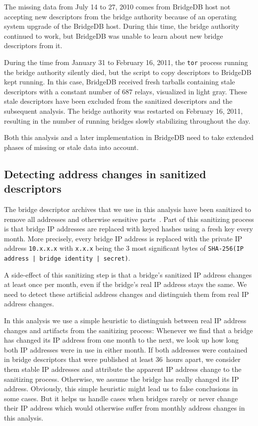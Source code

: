 \documentclass{article}
\begin{document}
The missing data from July 14 to 27, 2010 comes from BridgeDB host not
accepting new descriptors from the bridge authority because of an
operating system upgrade of the BridgeDB host.
During this time, the bridge authority continued to work, but BridgeDB was
unable to learn about new bridge descriptors from it.

During the time from January 31 to February 16, 2011, the \verb+tor+
process running the bridge authority silently died, but the script to copy
descriptors to BridgeDB kept running.
In this case, BridgeDB received fresh tarballs containing stale
descriptors with a constant number of 687 relays, visualized in light
gray.
These stale descriptors have been excluded from the sanitized descriptors
and the subsequent analysis.
The bridge authority was restarted on February 16, 2011, resulting in the
number of running bridges slowly stabilizing throughout the day.

Both this analysis and a later implementation in BridgeDB need to take
extended phases of missing or stale data into account.

\subsection{Detecting address changes in sanitized descriptors}
\label{sec:sanitizing}

The bridge descriptor archives that we use in this analysis have been
sanitized to remove all addresses and otherwise sensitive
parts~\cite{loesing2011overview}.
Part of this sanitizing process is that bridge IP addresses are replaced
with keyed hashes using a fresh key every month.
More precisely, every bridge IP address is replaced with the private IP
address \verb+10.x.x.x+ with \verb+x.x.x+ being the 3 most significant
bytes of \verb+SHA-256(IP address | bridge identity | secret)+.

A side-effect of this sanitizing step is that a bridge's sanitized IP
address changes at least once per month, even if the bridge's real IP
address stays the same.
We need to detect these artificial address changes and distinguish them
from real IP address changes.

In this analysis we use a simple heuristic to distinguish between real IP
address changes and artifacts from the sanitizing process:
Whenever we find that a bridge has changed its IP address from one month
to the next, we look up how long both IP addresses were in use in either
month.
If both addresses were contained in bridge descriptors that were published
at least 36~hours apart, we consider them stable IP addresses and
attribute the apparent IP address change to the sanitizing process.
Otherwise, we assume the bridge has really changed its IP address.
Obviously, this simple heuristic might lead us to false conclusions in
some cases.
But it helps us handle cases when bridges rarely or never change their IP
address which would otherwise suffer from monthly address changes in this
analysis.
\end{document}
